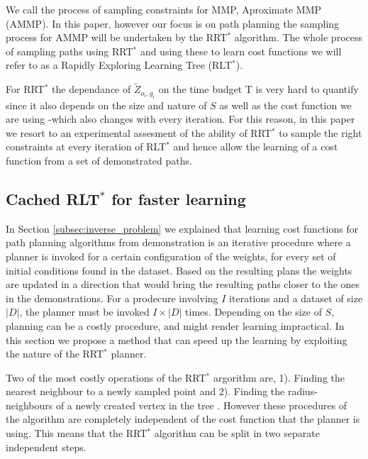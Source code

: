 \documentclass{article}  %
\begin{document}
	We call the process of sampling constraints for MMP, Aproximate MMP (AMMP). In this paper, however our focus is on path planning the sampling process for AMMP will be undertaken by the RRT$^*$ algorithm. The whole process of sampling paths using RRT$^*$ and using these to learn cost functions we will refer to as a Rapidly Exploring Learning Tree (RLT$^*$).

For RRT$^*$ the dependance of $\tilde{Z}_{o_i,g_i}$ on the time budget T is very hard to quantify since it also depends on the size and nature of $S$ as well as the cost function we are using -which also changes with every iteration. For this reason, in this paper we resort to an experimental assesment of the ability of RRT$^*$ to sample the right constraints at every iteration of RLT$^*$ and hence allow the learning of a cost function from a set of demonstrated paths.



\subsection{Cached RLT$^*$ for faster learning \label{subsec:cached}}
	In Section \ref{subsec:inverse_problem} we explained that learning cost functions for path planning algorithms from demonstration is an iterative procedure where a planner is invoked for a certain configuration of the weights, for every set of initial conditions found in the dataset. Based on the resulting plans the weights are updated in a direction that would bring the resulting paths closer to the ones in the demonstrations. For a prodecure involving $I$ iterations and a dataset of size $|D|$, the planner must be invoked $I\times|D|$ times. Depending on the size of $S$, planning can be a costly procedure, and might render learning impractical. In this section we propose a method that can speed up the learning by exploiting the nature of the RRT$^*$ planner.

	Two of the most costly operations of the RRT$^*$ argorithm are, 1). Finding the nearest neighbour to a newly sampled point and 2). Finding the radius-neighbours of a newly created vertex in the tree \cite{karaman2011sampling}. However these procedures of the algorithm are completely independent of the cost function that the planner is using. This means that the RRT$^*$ algorithm can be split in two separate independent steps. 
\end{document}
